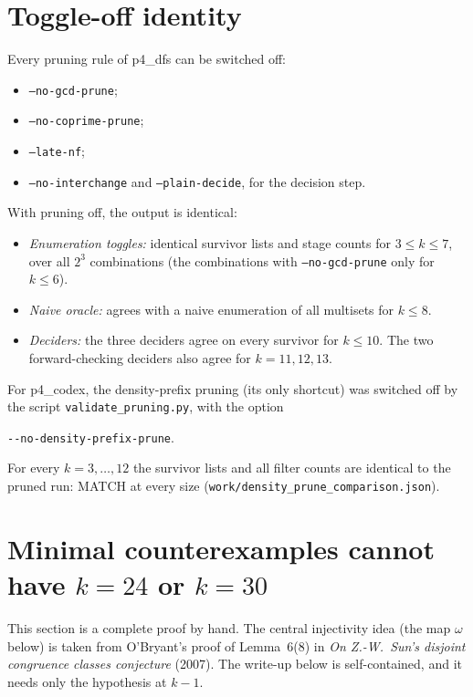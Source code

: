 \documentclass[11pt]{article}
\theoremstyle{definition}
\theoremstyle{remark}
\begin{document}
\section{Toggle-off identity}

Every pruning rule of p4\_dfs can be switched off:
\begin{itemize}
\item \texttt{--no-gcd-prune};
\item \texttt{--no-coprime-prune};
\item \texttt{--late-nf};
\item \texttt{--no-interchange} and \texttt{--plain-decide}, for the decision step.
\end{itemize}
With pruning off, the output is identical:
\begin{itemize}
\item \emph{Enumeration toggles:} identical survivor lists and stage counts for $3\le k\le7$, over all
  $2^3$ combinations (the combinations with \texttt{--no-gcd-prune} only for $k\le6$).
\item \emph{Naive oracle:} agrees with a naive enumeration of all multisets for $k\le8$.
\item \emph{Deciders:} the three deciders agree on every survivor for $k\le10$. The two
  forward-checking deciders also agree for $k=11,12,13$.
\end{itemize}
{\sloppy For p4\_codex, the density-prefix pruning (its only shortcut) was switched off by the script
\texttt{validate\_pruning.py}, with the option
\begin{center}\texttt{-{}-no-density-prefix-prune}.\end{center}
For every
$k=3,\dots,12$
the survivor lists and all filter counts are identical to the pruned run: MATCH at every size
(\texttt{work/density\_prune\_comparison.json}).\par}

\section{Minimal counterexamples cannot have $k=24$ or $k=30$}

This section is a complete proof by hand. The central injectivity idea (the map $\omega$ below)
is taken from O'Bryant's proof of Lemma~6(8) in \emph{On Z.-W.\ Sun's disjoint congruence
classes conjecture} (2007). The write-up below is self-contained, and it needs only the
hypothesis at $k-1$.
\end{document}
